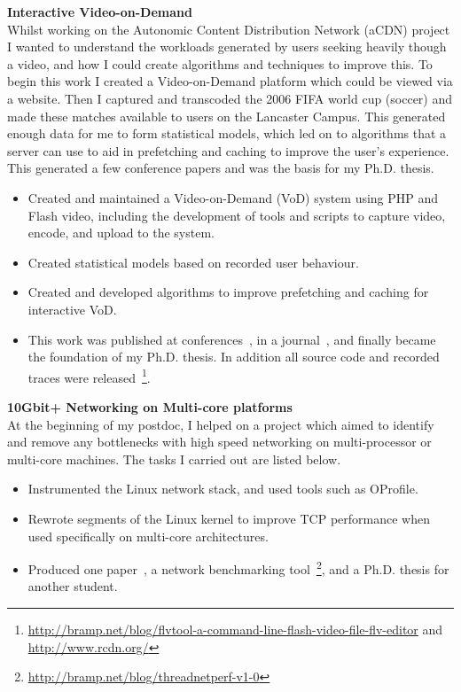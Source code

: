 \documentclass[a4paper,10pt]{article}
\begin{document}
 \textbf{Interactive Video-on-Demand}\\
 Whilst working on the Autonomic Content Distribution Network (aCDN) project I wanted to understand the workloads generated by users seeking heavily though a video, and how I could create algorithms and techniques to improve this. To begin this work I created a Video-on-Demand platform which could be viewed via a website. Then I captured and transcoded the 2006 FIFA world cup (soccer) and made these matches available to users on the Lancaster Campus. This generated enough data for me to form statistical models, which led on to algorithms that a server can use to aid in prefetching and caching to improve the user's experience. This generated a few conference papers and was the basis for my Ph.D. thesis.

\begin{itemize}
 \item Created and maintained a Video-on-Demand (VoD) system using PHP and Flash video, including the development of tools and scripts to capture video, encode, and upload to the system.
 \item Created statistical models based on recorded user behaviour.
 \item Created and developed algorithms to improve prefetching and caching for interactive VoD.
 \item This work was published at conferences~\cite{brampton2007cui,macquire2008acf}, in a journal~\cite{brampton2008cew}, and finally became the foundation of my Ph.D. thesis. In addition all source code and recorded traces were released~\footnote{\href{http://bramp.net/blog/flvtool-a-command-line-flash-video-file-flv-editor}{http://bramp.net/blog/flvtool-a-command-line-flash-video-file-flv-editor} and \href{http://www.rcdn.org/}{http://www.rcdn.org/}}.
\end{itemize}

 \textbf{10Gbit+ Networking on Multi-core platforms}\\
 At the beginning of my postdoc, I helped on a project which aimed to identify and remove any bottlenecks with high speed networking on multi-processor or multi-core machines. The tasks I carried out are listed below.

\begin{itemize}
 \item Instrumented the Linux network stack, and used tools such as OProfile.
 \item Rewrote segments of the Linux kernel to improve TCP performance when used specifically on multi-core architectures.
 \item Produced one paper~\cite{faulkner2009epn}, a network benchmarking tool~\footnote{\href{http://bramp.net/blog/threadnetperf-v1-0}{http://bramp.net/blog/threadnetperf-v1-0}}, and a Ph.D. thesis for another student.
\end{itemize}
\end{document}
